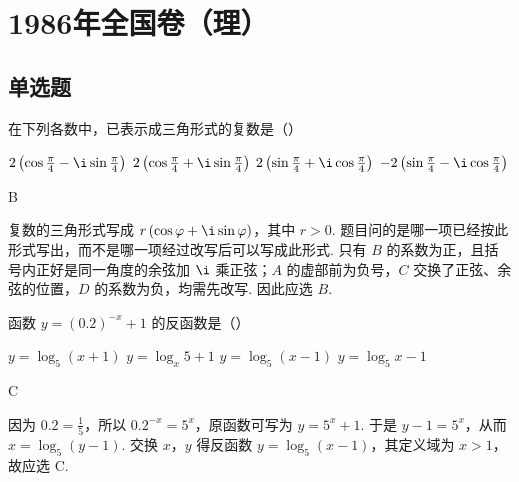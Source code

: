 \documentclass[UTF8,a4paper,oneside,11pt]{ctexbook}
\begin{document}
\mainmatter

\chapter{1986年全国卷（理）}

\section{单选题}

\begin{problem}

在下列各数中，已表示成三角形式的复数是（\quad）

\choices
    {\(2\left(\cos \frac{\pi}{4} - \i\sin \frac{\pi}{4}\right)\)}
    {\(2\left(\cos \frac{\pi}{4} + \i\sin \frac{\pi}{4}\right)\)}
    {\(2\left(\sin \frac{\pi}{4} + \i\cos \frac{\pi}{4}\right)\)}
    {\(-2\left(\sin \frac{\pi}{4} - \i\cos \frac{\pi}{4}\right)\)}
\end{problem}

\begin{answer}
B
\end{answer}

\begin{solution}
复数的三角形式写成 \(r\left(\cos\varphi+\i\sin\varphi\right)\)，其中 \(r>0\). 题目问的是哪一项已经按此形式写出，而不是哪一项经过改写后可以写成此形式. 只有 \(B\) 的系数为正，且括号内正好是同一角度的余弦加 \(\i\) 乘正弦；\(A\) 的虚部前为负号，\(C\) 交换了正弦、余弦的位置，\(D\) 的系数为负，均需先改写. 因此应选 \(B\).
\end{solution}

\begin{problem}

函数 \(y = (0.2)^{-x} + 1\) 的反函数是（\quad）

\choices
    {\(y = \log_5 (x + 1)\)}
    {\(y = \log_x 5 + 1\)}
    {\(y = \log_5 (x - 1)\)}
    {\(y = \log_5 x - 1\)}
\end{problem}

\begin{answer}
C
\end{answer}

\begin{solution}
因为 \(0.2=\frac{1}{5}\)，所以 \(0.2^{-x}=5^x\)，原函数可写为 \(y=5^x+1\). 于是 \(y-1=5^x\)，从而 \(x=\log_5(y-1)\). 交换 \(x\)，\(y\) 得反函数 \(y=\log_5(x-1)\)，其定义域为 \(x>1\)，故应选 C.
\end{solution}
\end{document}
